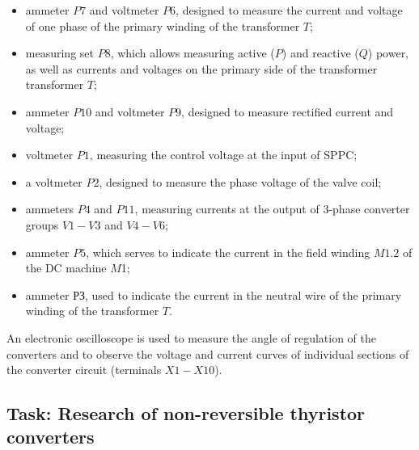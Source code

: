 \documentclass[a4paper,14pt]{article}
\begin{document}
\begin{itemize}
\item ammeter $P7$ and voltmeter $P6$, designed to measure the current and voltage of one phase of the primary winding of the transformer $T$;

\item measuring set $P8$, which allows measuring active ($P$) and reactive ($Q$) power, as well as currents and voltages on the primary side of the transformer transformer $T$;

\item ammeter $P10$ and voltmeter $P9$, designed to measure rectified current and voltage;

\item voltmeter $P1$, measuring the control voltage at the input of SPPC;

\item a voltmeter $P2$, designed to measure the phase voltage of the valve coil;

\item ammeters $P4$ and $P11$, measuring currents at the output of 3-phase converter groups $V1-V3$ and $V4-V6$;

\item ammeter $P5$, which serves to indicate the current in the field winding $M1.2$ of the DC machine $M$1;

\item ammeter $РЗ$, used to indicate the current in the neutral wire of the primary winding of the transformer $T$.
\end{itemize}

An electronic oscilloscope is used to measure the angle of regulation of the converters and to observe the voltage and current curves of individual sections of the converter circuit (terminals $X1-X10$).

\subsection{Task: Research of non-reversible thyristor converters}
\end{document}
